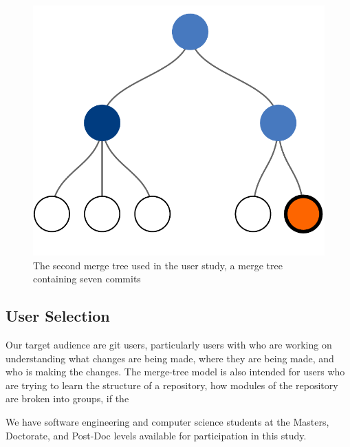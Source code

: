 \begin{figure}[bpt]
  \centering
  \includegraphics[width=0.5\linewidth]{figures/commits/7-commits.pdf}
  \caption{The second merge tree used in the user study, a merge tree
    containing seven commits}
  \label{fig:commit_2}
\end{figure}


\subsection{User Selection}
\label{sub:user_selection}

Our target audience are git users, particularly users with who are
working on understanding what changes are being made, where they are
being made, and who is making the changes. The merge-tree model is also
intended for users who are trying to learn the structure of a
repository, how modules of the repository are broken into groups, if the

We have software engineering and computer science students at the
Masters, Doctorate, and Post-Doc levels available for participation in
this study. 
